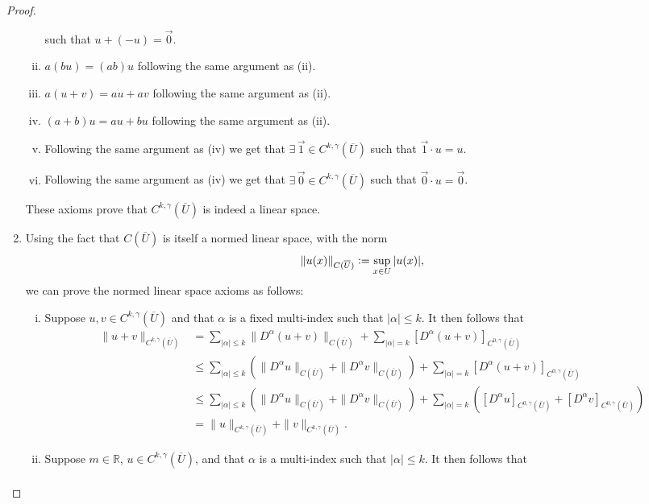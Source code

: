 \documentclass[11pt]{article}
\newcommand{\defeq}{\vcentcolon=}
\begin{document}
\begin{proof}
\begin{enumerate}[1.]
\begin{enumerate}[(i)]
					such that $u+(-u) = \vec{0}$.
				\item $a(bu) = (ab)u$ following the same argument as (ii).
				\item $a(u + v) = au + av$ following the same argument as (ii).
				\item $(a+b)u = au + bu$ following the same argument as (ii).
				\item Following the same argument as (iv) we get that $\exists \, \vec{1} \in C^{k,\gamma}(\overline{U})$
					such that $\vec{1} \cdot u = u$.
				\item Following the same argument as (iv) we get that $\exists \, \vec{0} \in C^{k,\gamma}(\overline{U})$
					such that $\vec{0} \cdot u = \vec{0}$.
			\end{enumerate}
			These axioms prove that $C^{k,\gamma}(\overline{U})$ is indeed a linear space.
		\item Using the fact that $C(\overline{U})$ is itself a normed linear space, with the norm
			\[\|u(x)\|_{C(\overline{U})} \defeq \sup_{x \in U}{|u(x)|},\]
			we can prove the normed linear space axioms as follows:
			\begin{enumerate}[(i)]
				\item Suppose $u,v \in C^{k,\gamma}(\overline{U})$ and that $\alpha$ is a fixed multi-index
					such that $|\alpha| \leq k$. It then follows that
					\begin{align*}
						\|u+v\|_{C^{k,\gamma}(\overline{U})} &= \sum_{|\alpha| \leq k}\|D^{\alpha}(u+v)\|_{C(\overline{U})}
											+ \sum_{|\alpha| = k}[D^{\alpha}(u+v)]_{C^{0,\gamma}(\overline{U})} \\
						&\leq \sum_{|\alpha| \leq k}(\|D^{\alpha}u\|_{C(\overline{U})} + \|D^{\alpha}v\|_{C(\overline{U})})
						    + \sum_{|\alpha| = k}[D^{\alpha}(u+v)]_{C^{0,\gamma}(\overline{U})}\\
						&\leq \sum_{|\alpha| \leq k}(\|D^{\alpha}u\|_{C(\overline{U})} + \|D^{\alpha}v\|_{C(\overline{U})})
						                                                    + \sum_{|\alpha| = k}([D^{\alpha}u]_{C^{0,\gamma}(\overline{U})} + [D^{\alpha}v]_{C^{0,\gamma}(\overline{U})})\\
						&= \|u\|_{C^{k,\gamma}(\overline{U})} + \|v\|_{C^{k,\gamma}(\overline{U})}.
					\end{align*}
				\item Suppose $m \in \mathbb{R}$, $u \in C^{k,\gamma}(\overline{U})$, and that $\alpha$ is a multi-index such that
					$|\alpha| \leq k$. It then follows that
					\begin{align*}

\end{align*}
\end{enumerate}
\end{enumerate}
\end{proof}
\end{document}
